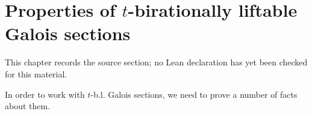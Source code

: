 \chapter{Properties of $t$-birationally liftable Galois sections}
\label{birational-section-conjecture-strong-birationality-chapter-04}

\begin{remark}
\label{birational-section-conjecture-strong-birationality-chapter-04-source}
This chapter records the source section; no Lean declaration has yet been checked for this material.
\notready
\end{remark}

\label{tprop}



In order to work with $t$-b.l. Galois sections, we need to prove a number of facts about them.

